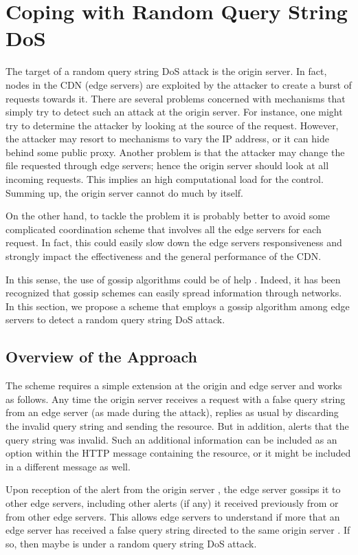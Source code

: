 \documentclass{IEEEtran}
\begin{document}
\section{Coping with Random Query String DoS}
\label{sec:alg}

The target of a random query string DoS attack is the origin server. In fact, nodes in the CDN (edge servers) are exploited by the attacker to create a burst of requests towards it.
There are several problems concerned with mechanisms that simply try to detect such an attack at the origin server. 
For instance, one might try to determine the attacker by looking at the source of the request. However, the attacker may resort to mechanisms to vary the IP address, or it can hide behind some public proxy.
Another problem is that the attacker may change the file requested through edge servers; hence the origin server should look at all incoming requests. This implies an high computational load for the control.
Summing up, the origin server cannot do much by itself.

On the other hand, to tackle the problem it is probably better to avoid some complicated coordination scheme that involves all the edge servers for each request. In fact, this could easily slow down the edge servers responsiveness and strongly impact the effectiveness and the general performance of the CDN.

In this sense, the use of gossip algorithms could be of help \cite{simutools,disio11}.
Indeed, it has been recognized that gossip schemes can easily spread information through networks.
In this section, we propose a scheme that employs a gossip algorithm among edge servers to detect a random query string DoS attack.

\subsection{Overview of the Approach}

The scheme requires a simple extension at the origin and edge server and works as follows. 
Any time the origin server  receives a request with a false query string from an edge server   (as made during the attack),   replies as usual by discarding the invalid query string and sending the resource.
But in addition,  alerts  that the query string was invalid. Such an additional information can be included as an option within the HTTP message containing the resource, or it might be included in a different message as well.

Upon reception of the alert from the origin server , the edge server  gossips it to other edge servers, including other alerts (if any) it received previously from  or from other edge servers.
This allows edge servers to understand if more that an edge server has received a false query string directed to the same origin server . If so, then maybe  is under a random query string DoS attack.
\end{document}
